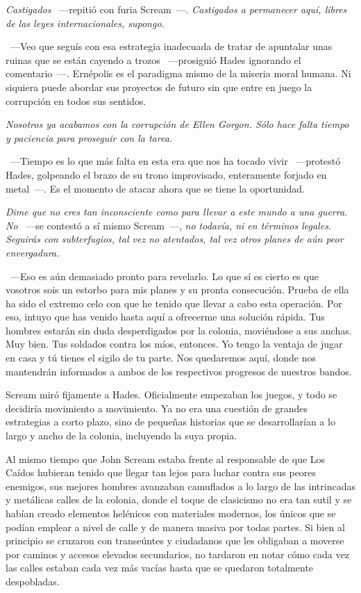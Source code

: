\emph{Castigados} ~---repitió con furia Scream~---. \emph{Castigados a permanecer aquí, libres de las leyes internacionales, supongo.}

~---Veo que seguís con esa estrategia inadecuada de tratar de apuntalar unas ruinas que se están cayendo a trozos ~---prosiguió Hades ignorando el comentario~---. Ernépolis es el paradigma mismo de la miseria moral humana. Ni siquiera puede abordar sus proyectos de futuro sin que entre en juego la corrupción en todos sus sentidos.

\emph{Nosotros ya acabamos con la corrupción de Ellen Gorgon. Sólo hace falta tiempo y paciencia para proseguir con la tarea.}

~---Tiempo es lo que más falta en esta era que nos ha tocado vivir ~---protestó Hades, golpeando el brazo de su trono improvisado, enteramente forjado en metal~---. Es el momento de atacar ahora que se tiene la oportunidad.

\emph{Dime que no eres tan inconsciente como para llevar a este mundo a una guerra. No} ~---se contestó a sí mismo Scream~---, \emph{no todavía, ni en términos legales. Seguirás con subterfugios, tal vez no atentados, tal vez otros planes de aún peor envergadura.}

~---Eso es aún demasiado pronto para revelarlo. Lo que sí es cierto es que vosotros sois un estorbo para mis planes y su pronta consecución. Prueba de ella ha sido el extremo celo con que he tenido que llevar a cabo esta operación. Por eso, intuyo que has venido hasta aquí a ofrecerme una solución rápida. Tus hombres estarán sin duda desperdigados por la colonia, moviéndose a sus anchas. Muy bien. Tus soldados contra los míos, entonces. Yo tengo la ventaja de jugar en casa y tú tienes el sigilo de tu parte. Nos quedaremos aquí, donde nos mantendrán informados a ambos de los respectivos progresos de nuestros bandos.

Scream miró fijamente a Hades. Oficialmente empezaban los juegos, y todo se decidiría movimiento a movimiento. Ya no era una cuestión de grandes estrategias a corto plazo, sino de pequeñas historias que se desarrollarían a lo largo y ancho de la colonia, incluyendo la suya propia.

\parbreak
Al mismo tiempo que John Scream estaba frente al responsable de que Los Caídos hubieran tenido que llegar tan lejos para luchar contra sus peores enemigos, sus mejores hombres avanzaban camuflados a lo largo de las intrincadas y metálicas calles de la colonia, donde el toque de clasicismo no era tan sutil y se habían creado elementos helénicos con materiales modernos, los únicos que se podían emplear a nivel de calle y de manera masiva por todas partes. Si bien al principio se cruzaron con transeúntes y ciudadanos que les obligaban a moverse por caminos y accesos elevados secundarios, no tardaron en notar cómo cada vez las calles estaban cada vez más vacías hasta que se quedaron totalmente despobladas.

